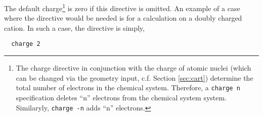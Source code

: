 The default charge\footnote{The charge directive in conjunction with
  the charge of atomic nuclei (which can be changed via the geometry
  input, c.f. Section \ref{sec:cart}) determine the total number of
  electrons in the chemical system.  Therefore, a \verb+charge n+
  specification deletes ``n'' electrons from the chemical system
  system.  Similaryly, \verb+charge -n+ adds ``n'' electrons.} is zero
if this directive is omitted.  An example of a case where the
directive would be needed is for a calculation on a doubly charged
cation.  In such a case, the directive is simply,
\begin{verbatim}
  charge 2
\end{verbatim}

%

